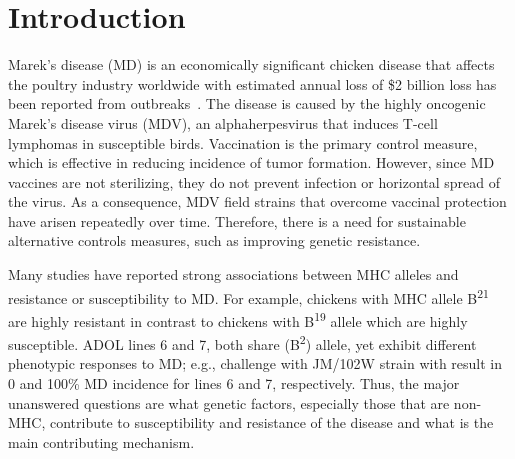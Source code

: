 \documentclass[10pt]{article}
\begin{document}
\section*{Introduction}

Marek's disease (MD) is an economically significant chicken disease that affects
the poultry industry worldwide with estimated annual loss of \$2 billion loss
has been reported from outbreaks~\cite{morrow2004marek}.  The disease is caused
by the highly oncogenic Marek's disease virus (MDV), an alphaherpesvirus that
induces T-cell lymphomas in susceptible birds.  Vaccination is the primary
control measure, which is effective in reducing incidence of tumor formation.
However, since MD vaccines are not sterilizing, they do not prevent infection or
horizontal spread of the virus.  As a consequence, MDV field strains that
overcome vaccinal protection have arisen repeatedly over time.  Therefore, there
is a need for sustainable alternative controls measures, such as improving
genetic resistance.

Many studies have reported strong associations between MHC alleles and
resistance or susceptibility to MD.  For example, chickens with MHC allele
B\textsuperscript{21} are highly resistant in contrast to chickens with
B\textsuperscript{19} allele which are highly susceptible.  ADOL lines 6 and 7,
both share (B\textsuperscript{2}) allele, yet exhibit different phenotypic
responses to MD; e.g., challenge with JM/102W strain with result in 0 and 100\%
MD incidence for lines 6 and 7, respectively.  Thus, the major unanswered
questions are what genetic factors, especially those that are non-MHC,
contribute to susceptibility and resistance of the disease and what is the main
contributing mechanism.
\end{document}

